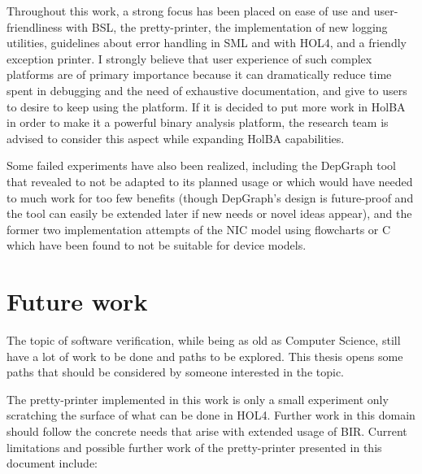 \documentclass{kththesis}
\begin{document}
{Throughout this work, a strong focus has been placed on ease of use and user-friendliness with BSL, the pretty-printer, the implementation of new logging utilities, guidelines about error handling in SML and with HOL4, and a friendly exception printer. I strongly believe that user experience of such complex platforms are of primary importance because it can dramatically reduce time spent in debugging and the need of exhaustive documentation, and give to users to desire to keep using the platform. If it is decided to put more work in HolBA in order to make it a powerful binary analysis platform, the research team is advised to consider this aspect while expanding HolBA capabilities.

Some failed experiments have also been realized, including the DepGraph tool that revealed to not be adapted to its planned usage or which would have needed to much work for too few benefits (though DepGraph's design is future-proof and the tool can easily be extended later if new needs or novel ideas appear), and the former two implementation attempts of the NIC model using flowcharts or C which have been found to not be suitable for device models.

\section{Future work}

The topic of software verification, while being as old as Computer Science, still have a lot of work to be done and paths to be explored. This thesis opens some paths that should be considered by someone interested in the topic.

The pretty-printer implemented in this work is only a small experiment only scratching the surface of what can be done in HOL4. Further work in this domain should follow the concrete needs that arise with extended usage of BIR. Current limitations and possible further work of the pretty-printer presented in this document include:

}
\end{document}
